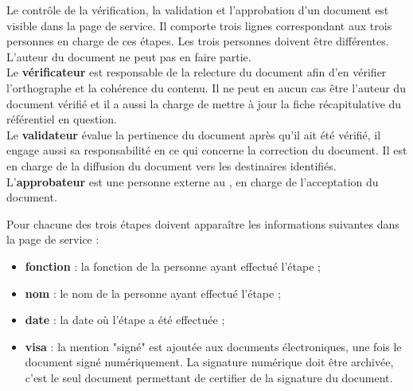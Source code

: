 Le contrôle de la vérification, la validation et l’approbation d’un document est visible dans la page de service. Il comporte trois lignes correspondant aux trois personnes en charge de ces étapes. Les trois personnes doivent être différentes. L'auteur du document ne peut pas en faire partie.\\

Le \textbf{vérificateur} est responsable de la relecture du document afin d’en vérifier l’orthographe et la cohérence du contenu. Il ne peut en aucun cas être l'auteur du document vérifié et il a aussi la charge de mettre à jour la fiche récapitulative du référentiel en question.\\

Le \textbf{validateur} évalue la pertinence du document après qu’il ait été vérifié, il engage aussi sa responsabilité en ce qui concerne la correction du document. Il est en charge de la diffusion du document vers les destinaires identifiés.\\

L’\textbf{approbateur} est une personne externe au \pic{}, en charge de l’acceptation du document.

Pour chacune des trois étapes doivent apparaître les informations suivantes dans la page de service :
\begin{itemize}
\item \textbf{fonction} : la fonction de la personne ayant effectué l’étape ;
\item  \textbf{nom} : le nom de la personne ayant effectué l’étape ;
\item \textbf{date} : la date où l’étape a été effectuée ;
\item \textbf{visa} : la mention "signé" est ajoutée aux documents électroniques, une fois le document signé numériquement. La signature numérique doit être archivée, c'est le seul document permettant de certifier de la signature du document.

\end{itemize}

